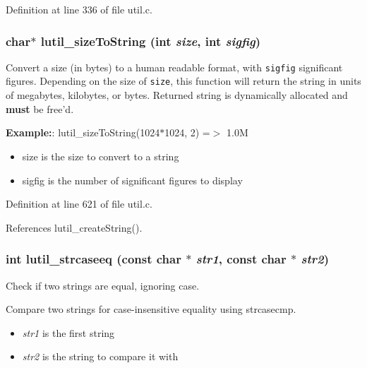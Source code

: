 Definition at line 336 of file util.c.
\subsubsection{\setlength{\rightskip}{0pt plus 5cm}char$\ast$ lutil\_\-size\-To\-String (int {\em size}, int {\em sigfig})}\label{util_8h_a31}


Convert a size (in bytes) to a human readable format, with {\tt sigfig} significant figures. Depending on the size of {\tt size}, this function will return the string in units of megabytes, kilobytes, or bytes. Returned string is dynamically allocated and {\bf must} be free'd.

{\bf Example:}: lutil\_\-size\-To\-String(1024$\ast$1024, 2) =$>$ 1.0M

\begin{itemize}
\item size is the size to convert to a string \item sigfig is the number of significant figures to display 
\end{itemize}


Definition at line 621 of file util.c.

References lutil\_\-create\-String().
\subsubsection{\setlength{\rightskip}{0pt plus 5cm}int lutil\_\-strcaseeq (const char $\ast$ {\em str1}, const char $\ast$ {\em str2})\hspace{0.3cm}{\tt  [inline]}}\label{util_8h_a11}


Check if two strings are equal, ignoring case. 

Compare two strings for case-insensitive equality using strcasecmp.

\begin{itemize}
\item {\em str1\/} is the first string \item {\em str2\/} is the string to compare it with 
\end{itemize}


